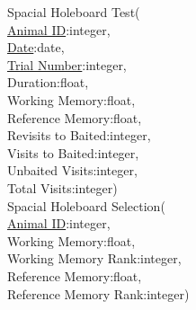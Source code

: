 \documentclass[12pt]{article}
\begin{document}
	\indent Spacial Holeboard Test(\\
	\indent\indent \underline{Animal ID}:integer,\\
	\indent\indent \underline{Date}:date,\\
	\indent\indent \underline{Trial Number}:integer,\\
	\indent\indent Duration:float,\\
	\indent\indent Working Memory:float,\\
	\indent\indent Reference Memory:float,\\
	\indent\indent Revisits to Baited:integer,\\
	\indent\indent Visits to Baited:integer,\\
	\indent\indent Unbaited Visits:integer,\\
	\indent\indent Total Visits:integer)\\
	
	\indent Spacial Holeboard Selection(\\
	\indent\indent \underline{Animal ID}:integer,\\
	\indent\indent Working Memory:float,\\
	\indent\indent Working Memory Rank:integer,\\
	\indent\indent Reference Memory:float,\\
	\indent\indent Reference Memory Rank:integer)
	
	
\end{document}
